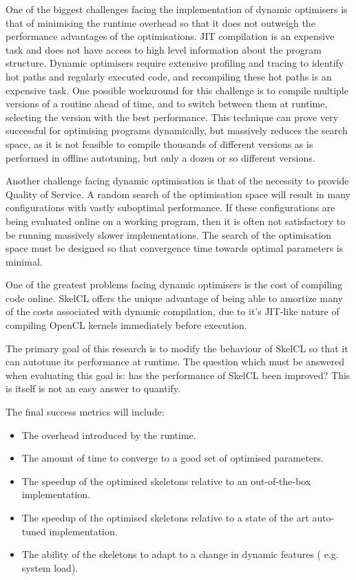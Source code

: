 One of the biggest challenges facing the implementation of dynamic
optimisers is that of minimising the runtime overhead so that it does
not outweigh the performance advantages of the optimisations. JIT
compilation is an expensive task and does not have access to high
level information about the program structure. Dynamic optimisers
require extensive profiling and tracing to identify hot paths and
regularly executed code, and recompiling these hot paths is an
expensive task. One possible workaround for this challenge is to
compile multiple versions of a routine ahead of time, and to switch
between them at runtime, selecting the version with the best
performance. This technique can prove very successful for optimising
programs dynamically, but massively reduces the search space, as it is
not feasible to compile thousands of different versions as is
performed in offline autotuning, but only a dozen or so different
versions.

Another challenge facing dynamic optimisation is that of the necessity
to provide Quality of Service. A random search of the optimisation
space will result in many configurations with vastly suboptimal
performance. If these configurations are being evaluated online on a
working program, then it is often not satisfactory to be running
massively slower implementations. The search of the optimisation space
must be designed so that convergence time towards optimal parameters
is minimal.

One of the greatest problems facing dynamic optimisers is the cost of
compiling code online. SkelCL offers the unique advantage of being
able to amortize many of the costs associated with dynamic
compilation, due to it's JIT-like nature of compiling OpenCL kernels
immediately before execution.


The primary goal of this research is to modify the behaviour of SkelCL
so that it can autotune its performance at runtime. The question which
must be answered when evaluating this goal is: has the performance of
SkelCL been improved? This is itself is not an easy answer to
quantify.

The final success metrics will include:

\begin{itemize}
\item The overhead introduced by the runtime.
\item The amount of time to converge to a good set of optimised
parameters.
\item The speedup of the optimised skeletons relative to an
out-of-the-box implementation.
\item The speedup of the optimised skeletons relative to a state of the
art auto-tuned implementation.
\item The ability of the skeletons to adapt to a change in dynamic features (
e.g. system load).
\end{itemize}

